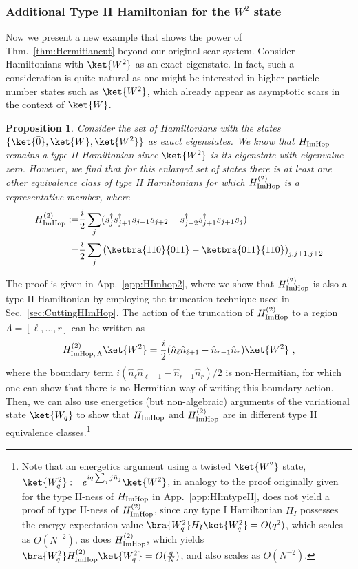 \documentclass[prx,letterpaper,aps,superscriptaddress,floatfix,twocolumn,nofootinbib]{revtex4-2}
\newtheorem{prop}{Proposition}
\theoremstyle{definition}
\newcommand{\HImHopLambda}{H_{\text{ImHop},\, \Lambda}}
\begin{document}
\subsubsection{Additional Type II Hamiltonian for the $W^2$ state}
%
Now we present a new example that shows the power of Thm.~\ref{thm:Hermitiancut} beyond our original scar system. Consider Hamiltonians with $\ket{W^2}$ as an exact eigenstate.
%
In fact, such a consideration is quite natural as one might be interested in higher particle number states such as $\ket{W^2}$, which already appear as asymptotic scars in the context of $\ket{W}$.
%
\begin{prop}\label{prop:HImhop2}
    Consider the set of Hamiltonians with the states
    $\{\ket{\bar{0}},\ket{W},\ket{W^2}\}$ as exact eigenstates.
    We know that $H_{\rm ImHop}$ remains a type II Hamiltonian since $\ket{W^2}$ is its eigenstate with eigenvalue zero.
    However, we find that for this enlarged set of states there is at least one other equivalence class of type II Hamiltonians for which $H_{\rm ImHop}^{(2)}$ is a representative member, where
    \begin{align}
        H_{\rm ImHop}^{(2)} :=& \frac{i}{2}\sum_j (s_j^\dag s^\dag_{j+1} s_{j+1}s_{j+2} - s_{j+2}^\dag s_{j+1}^\dag s_{j+1} s_j)\, \nonumber\\
        =& \frac{i}{2}\sum_j \left( \ketbra{110}{011} - \ketbra{011}{110} \right)_{j,j+1,j+2}
        \label{eq:HImHop2}
    \end{align}
    \end{prop}
The proof is given in App.~\ref{app:HImhop2}, where we show that $H_{\rm ImHop}^{(2)}$ is also a type II Hamiltonian by employing the truncation technique used in Sec.~\ref{sec:CuttingHImHop}.
%
The action of the truncation of $H_{\rm ImHop}^{(2)}$ to a region $\Lambda = [\ell, \dots, r]$ can be written as
\begin{equation}
\HImHopLambda^{(2)} \ket{W^2} = \frac{i}{2} (\hat{n}_\ell \hat{n}_{\ell+1} - \hat{n}_{r-1}\hat{n}_r) \ket{W^2} ~,
\label{eq:HImHop2_Lambda_W2}
\end{equation}
where the boundary term $i (\hat{n}_\ell \hat{n}_{\ell+1} - \hat{n}_{r-1}\hat{n}_r)/2$ is non-Hermitian, for which one can show that there is no Hermitian way of writing this boundary action.
%
Then, we can also use energetics (but non-algebraic) arguments of the variational state $\ket{W_q}$ to show that $H_{\rm ImHop}$ and $H_{\rm ImHop}^{(2)}$ are in different type II equivalence classes.\footnote{Note that an energetics argument using a twisted $\ket{W^2}$ state, $\ket{W^2_q}:=e^{i q \sum_j j\hat{n}_j}\ket{W^2}$, in analogy to the proof originally given for the type II-ness of $H_{\rm ImHop}$ in App.~\ref{app:HImtypeII}, does not yield a proof of type II-ness of $H_{\rm ImHop}^{(2)}$, since any type I Hamiltonian $H_I$ possesses the energy expectation value
$\bra{W^2_q}H_I\ket{W^2_q}=O(q^2)$, which scales as $O(N^{-2})$, as does $H_{\rm ImHop}^{(2)}$, which yields $\bra{W^2_q}H_{\rm ImHop}^{(2)}\ket{W^2_q}=O(\frac{q}{N})$, and also scales as $O(N^{-2})$.}
%
\end{document}
